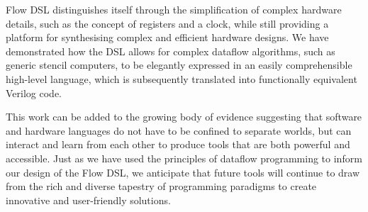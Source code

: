 Flow DSL distinguishes itself through the simplification of complex hardware details, such as the concept of registers and a clock, while still providing a platform for synthesising complex and efficient hardware designs. We have demonstrated how the DSL allows for complex dataflow algorithms, such as generic stencil computers, to be elegantly expressed in an easily comprehensible high-level language, which is subsequently translated into functionally equivalent Verilog code.

This work can be added to the growing body of evidence suggesting that software and hardware languages do not have to be confined to separate worlds, but can interact and learn from each other to produce tools that are both powerful and accessible. Just as we have used the principles of dataflow programming to inform our design of the Flow DSL, we anticipate that future tools will continue to draw from the rich and diverse tapestry of programming paradigms to create innovative and user-friendly solutions.